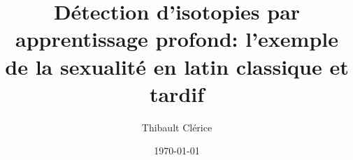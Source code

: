 \documentclass[12pt]{book}
\title{Détection d'isotopies par apprentissage profond: l'exemple de la sexualité en latin classique et tardif}
\author{Thibault Clérice}
\date{\today}
\begin{document}
\maketitle

\dominitoc

\tableofcontents



%

%

%
%
%
%




\appendix



\printglossary

\printbibliography
\end{document}
